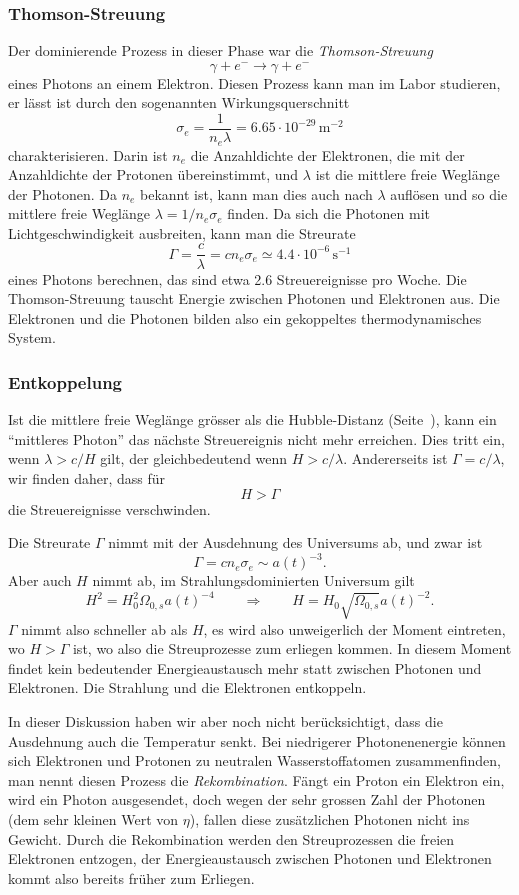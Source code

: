 \subsubsection{Thomson-Streuung}
Der dominierende Prozess in dieser Phase war die {\em Thomson-Streuung}
\[
\gamma + e^- \to \gamma + e^-
\]
%
eines Photons an einem Elektron.
Diesen Prozess kann man im Labor studieren, er lässt ist durch den
sogenannten Wirkungsquerschnitt
\[
\sigma_e
=
\frac{1}{n_e\lambda}
=
6.65\cdot 10^{-29}\,\text{m}^{-2}
\]
charakterisieren.
Darin ist $n_e$ die Anzahldichte der Elektronen, die mit der Anzahldichte
der Protonen übereinstimmt, und $\lambda$ ist die mittlere freie
Weglänge der Photonen.
Da $n_e$ bekannt ist, kann man dies auch nach $\lambda$ auflösen und
so die mittlere freie Weglänge $\lambda=1/n_e\sigma_e$ finden.
Da sich die Photonen mit Lichtgeschwindigkeit ausbreiten, kann man
die Streurate
\[
\Gamma
=
\frac{c}{\lambda}
=
cn_e\sigma_e\simeq 4.4\cdot 10^{-6}\,\text{s}^{-1}
\]
eines Photons berechnen, das sind etwa 2.6 Streuereignisse pro Woche.
Die Thomson-Streuung tauscht Energie zwischen Photonen und Elektronen aus.
Die Elektronen und die Photonen bilden also ein gekoppeltes thermodynamisches
System.

\subsubsection{Entkoppelung}
Ist die mittlere freie Weglänge grösser als die Hubble-Distanz
(Seite~\pageref{skript:section:hubble-distanz}),
kann ein ``mittleres Photon'' das nächste Streuereignis nicht
mehr erreichen.
Dies tritt ein, wenn $\lambda > c/H$ gilt,
der gleichbedeutend wenn $H>c/\lambda$.
Andererseits ist $\Gamma=c/\lambda$, wir finden daher, dass für 
\[
H>\Gamma
\]
die Streuereignisse verschwinden.

Die Streurate $\Gamma$ nimmt mit der Ausdehnung des Universums ab,
und zwar ist
\[
\Gamma
=
cn_e\sigma_e
\sim
a(t)^{-3}.
\]
Aber auch $H$ nimmt ab,
im Strahlungsdominierten Universum gilt
\[
H^2 = H_0^2  \Omega_{0,s} a(t)^{-4}
\qquad\Rightarrow\qquad
H=H_0\sqrt{\Omega_{0,s}} a(t)^{-2}.
\]
$\Gamma$ nimmt also schneller ab als $H$, es wird also unweigerlich
der Moment eintreten, wo $H>\Gamma$ ist, wo also die Streuprozesse
zum erliegen kommen.
In diesem Moment findet kein bedeutender Energieaustausch mehr statt
zwischen Photonen und Elektronen.
Die Strahlung und die Elektronen entkoppeln.

In dieser Diskussion haben wir aber noch nicht berücksichtigt, dass
die Ausdehnung auch die Temperatur senkt.
Bei niedrigerer Photonenenergie können sich Elektronen und Protonen
zu neutralen Wasserstoffatomen zusammenfinden, man nennt diesen
Prozess die {\em Rekombination}.
%
Fängt ein Proton ein Elektron ein, wird ein Photon ausgesendet,
doch wegen der sehr grossen Zahl der Photonen (dem sehr kleinen Wert
von $\eta$), fallen diese zusätzlichen Photonen nicht ins Gewicht.
Durch die Rekombination werden den Streuprozessen die freien Elektronen
entzogen, der Energieaustausch zwischen Photonen und Elektronen
kommt also bereits früher zum Erliegen.

